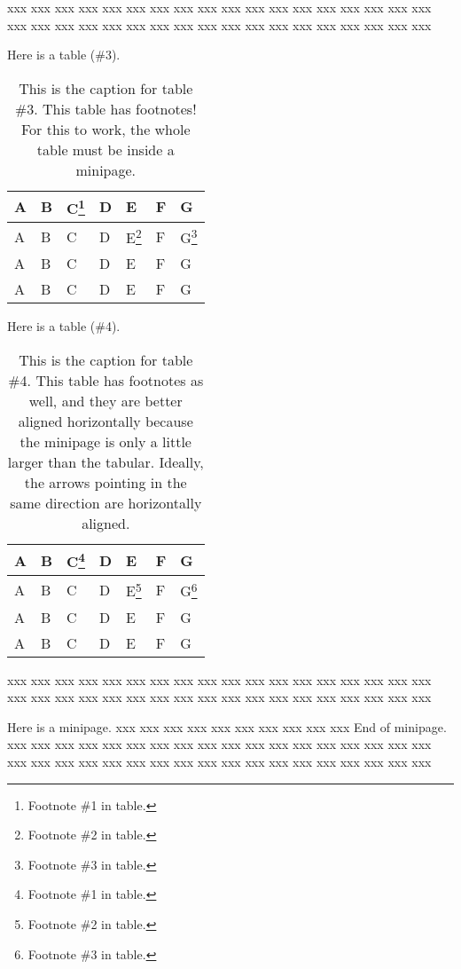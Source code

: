 \documentclass[10pt,twoside%
	]{article}
\begin{document}
xxx xxx xxx xxx xxx xxx xxx xxx xxx xxx xxx xxx xxx xxx xxx xxx xxx xxx 
xxx xxx xxx xxx xxx xxx xxx xxx xxx xxx xxx xxx xxx xxx xxx xxx xxx xxx 

Here is a table (\#3).
\begin{table}[b]
\caption{This is the caption for table \#3. This table has footnotes!
	For this to work, the whole table must be inside a minipage.}
\label{table3}
\Lhighlight
\begin{minipage}{\columnwidth}
\centering
\Lhighlight
\setTBstruts
\begin{tabular}{l|l|l|l|l|l|l}
\T\B
A&B&C\footnote
	{Footnote \#1 in table.}%
	&D&E&F&G\\
\hline\T\B
A&B&C&D&E\footnote
	{Footnote \#2 in table.}%
	&F&G\footnote
	{Footnote \#3 in table.}%
	\\
\hline\T\B
A&B&C&D&E&F&G\\
\hline\T\B
A&B&C&D&E&F&G\\
\end{tabular}%
\Rhighlight
\end{minipage}%
\Rhighlight
\end{table}

Here is a table (\#4).
\begin{table}
\caption{This is the caption for table \#4. This table has footnotes as
well, and they are better aligned horizontally because the minipage is
only a little larger than the tabular. Ideally, the arrows pointing in
the same direction are horizontally aligned.}
\label{table4}
\Lhighlight
\begin{minipage}{.65\columnwidth}
\centering
\Lhighlight
\setTBstruts
\begin{tabular}{l|l|l|l|l|l|l}
\T\B
A&B&C\footnote
	{Footnote \#1 in table.}%
	&D&E&F&G\\
\hline\T\B
A&B&C&D&E\footnote
	{Footnote \#2 in table.}%
	&F&G\footnote
	{Footnote \#3 in table.}%
	\\
\hline\T\B
A&B&C&D&E&F&G\\
\hline\T\B
A&B&C&D&E&F&G\\
\end{tabular}%
\Rhighlight
\end{minipage}%
\Rhighlight
\end{table}

xxx xxx xxx xxx xxx xxx xxx xxx xxx xxx xxx xxx xxx xxx xxx xxx xxx xxx 
xxx xxx xxx xxx xxx xxx xxx xxx xxx xxx xxx xxx xxx xxx xxx xxx xxx xxx 

Here is a minipage.
xxx xxx xxx xxx xxx xxx xxx xxx xxx xxx 
End of minipage.
xxx xxx xxx xxx xxx xxx xxx xxx xxx xxx xxx xxx xxx xxx xxx xxx xxx xxx 
xxx xxx xxx xxx xxx xxx xxx xxx xxx xxx xxx xxx xxx xxx xxx xxx xxx xxx 
\end{document}
